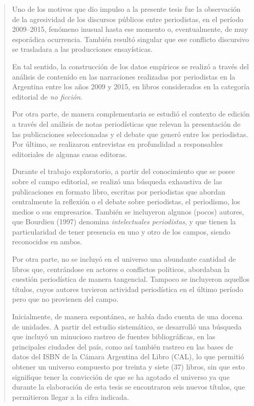 \begin{quote}
Uno de los motivos que dio impulso a la presente tesis fue la observación de la agresividad de los discursos públicos entre periodistas, en el período 2009--2015, fenómeno inusual hasta ese momento o, eventualmente, de muy esporádica ocurrencia. También resultó singular que ese conflicto discursivo se trasladara a las producciones ensayísticas.

En tal sentido, la construcción de los datos empíricos se realizó a través del análisis de contenido en las narraciones realizadas por periodistas en la Argentina entre los años 2009 y 2015, en libros considerados en la categoría editorial de \emph{no ficción}.

Por otra parte, de manera complementaria se estudió el contexto de edición a través del análisis de notas periodísticas que relevan la presentación de las publicaciones seleccionadas y el debate que generó entre los periodistas. Por último, se realizaron entrevistas en profundidad a responsables editoriales de algunas casas editoras.

Durante el trabajo exploratorio, a partir del conocimiento que se posee sobre el campo editorial, se realizó una búsqueda exhaustiva de las publicaciones en formato libro, escritas por periodistas que abordan centralmente la reflexión o el debate sobre periodistas, el periodismo, los medios o sus empresarios. También se incluyeron algunos (pocos) autores, que Bourdieu (1997) denomina \emph{intelectuales periodistas}, y que tienen la particularidad de tener presencia en uno y otro de los campos, siendo reconocidos en ambos.

Por otra parte, no se incluyó en el universo una abundante cantidad de libros que, centrándose en actores o conflictos políticos, abordaban la cuestión periodística de manera tangencial. Tampoco se incluyeron aquellos títulos, cuyos autores tuvieron actividad periodística en el último período pero que no provienen del campo.

Inicialmente, de manera espontánea, se había dado cuenta de una docena de unidades. A partir del estudio sistemático, se desarrolló una búsqueda que incluyó un minucioso rastreo de fuentes bibliográficas, en las principales ciudades del país, como así también rastreo en las bases de datos del ISBN de la Cámara Argentina del Libro (CAL), lo que permitió obtener un universo compuesto por treinta y siete (37) libros, sin que esto signifique tener la convicción de que se ha agotado el universo ya que durante la elaboración de esta tesis se encontraron seis nuevos títulos, que permitieron llegar a la cifra indicada.


\end{quote}
